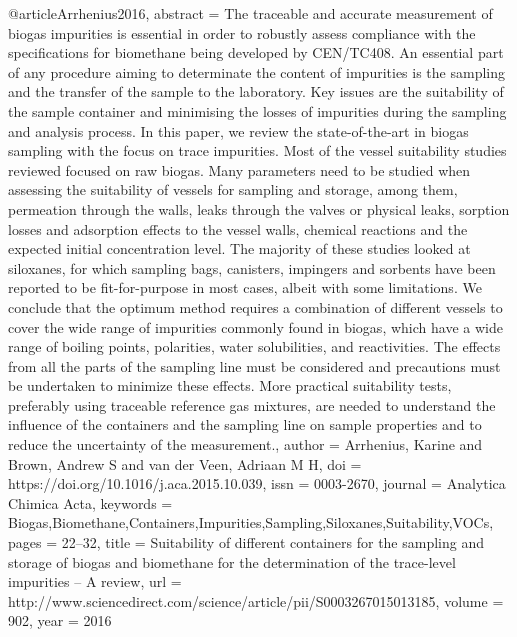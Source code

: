 @article{Arrhenius2016,
abstract = {The traceable and accurate measurement of biogas impurities is essential in order to robustly assess compliance with the specifications for biomethane being developed by CEN/TC408. An essential part of any procedure aiming to determinate the content of impurities is the sampling and the transfer of the sample to the laboratory. Key issues are the suitability of the sample container and minimising the losses of impurities during the sampling and analysis process. In this paper, we review the state-of-the-art in biogas sampling with the focus on trace impurities. Most of the vessel suitability studies reviewed focused on raw biogas. Many parameters need to be studied when assessing the suitability of vessels for sampling and storage, among them, permeation through the walls, leaks through the valves or physical leaks, sorption losses and adsorption effects to the vessel walls, chemical reactions and the expected initial concentration level. The majority of these studies looked at siloxanes, for which sampling bags, canisters, impingers and sorbents have been reported to be fit-for-purpose in most cases, albeit with some limitations. We conclude that the optimum method requires a combination of different vessels to cover the wide range of impurities commonly found in biogas, which have a wide range of boiling points, polarities, water solubilities, and reactivities. The effects from all the parts of the sampling line must be considered and precautions must be undertaken to minimize these effects. More practical suitability tests, preferably using traceable reference gas mixtures, are needed to understand the influence of the containers and the sampling line on sample properties and to reduce the uncertainty of the measurement.},
author = {Arrhenius, Karine and Brown, Andrew S and van der Veen, Adriaan M H},
doi = {https://doi.org/10.1016/j.aca.2015.10.039},
issn = {0003-2670},
journal = {Analytica Chimica Acta},
keywords = {Biogas,Biomethane,Containers,Impurities,Sampling,Siloxanes,Suitability,VOCs},
pages = {22--32},
title = {{Suitability of different containers for the sampling and storage of biogas and biomethane for the determination of the trace-level impurities – A review}},
url = {http://www.sciencedirect.com/science/article/pii/S0003267015013185},
volume = {902},
year = {2016}
}
